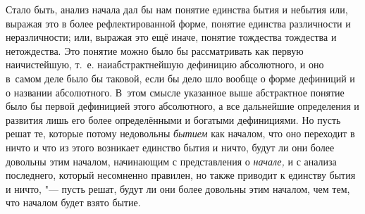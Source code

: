 Стало быть, анализ начала дал бы нам понятие единства бытия и небытия или,
выражая это в более рефлектированной форме, понятие единства различности и
неразличности; или, выражая это ещё иначе, понятие тождества тождества и
нетождества. Это понятие можно было бы рассматривать
как первую наичистейшую, т.~е. наиабстрактнейшую дефиницию абсолютного, и оно
в~самом деле было бы таковой, если бы дело шло вообще о форме дефиниций и о
названии абсолютного. В~этом смысле указанное выше абстрактное понятие было бы
первой дефиницией этого абсолютного, а все дальнейшие определения и развития
лишь его более определёнными и богатыми дефинициями. Но пусть решат те, которые
потому недовольны {\em бытием} как началом, что оно переходит в ничто и что из
этого возникает единство бытия и ничто, будут ли они более довольны этим
началом, начинающим с представления о {\em начале,} и с анализа последнего,
который несомненно правилен, но также приводит к единству бытия и ничто, "---
пусть решат, будут ли они более довольны этим началом, чем тем, что началом
будет взято бытие.

